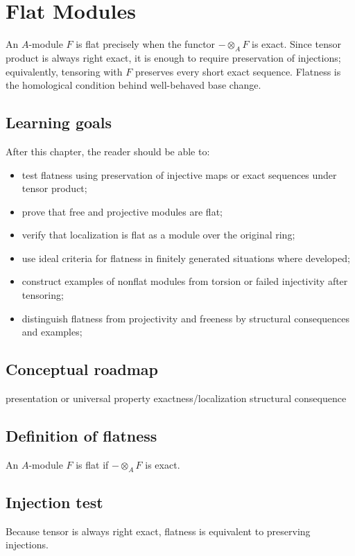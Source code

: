 \chapter{Flat Modules}
\label{ch:v14}

An \(A\)-module \(F\) is flat precisely when the functor \(-\otimes_A F\) is exact. Since tensor product is always right exact, it is enough to require preservation of injections; equivalently, tensoring with \(F\) preserves every short exact sequence. Flatness is the homological condition behind well-behaved base change.

\section*{Learning goals}
After this chapter, the reader should be able to:
\begin{itemize}
\item test flatness using preservation of injective maps or exact sequences under tensor product;
\item prove that free and projective modules are flat;
\item verify that localization is flat as a module over the original ring;
\item use ideal criteria for flatness in finitely generated situations where developed;
\item construct examples of nonflat modules from torsion or failed injectivity after tensoring;
\item distinguish flatness from projectivity and freeness by structural consequences and examples;
\end{itemize}
\section*{Conceptual roadmap}
\volroadmap
  {presentation or universal property}
  {exactness/localization}
  {structural consequence}

\section{Definition of flatness}
An $A$-module $F$ is flat if $-\otimes_A F$ is exact.

\section{Injection test}
Because tensor is always right exact, flatness is equivalent to preserving injections.


